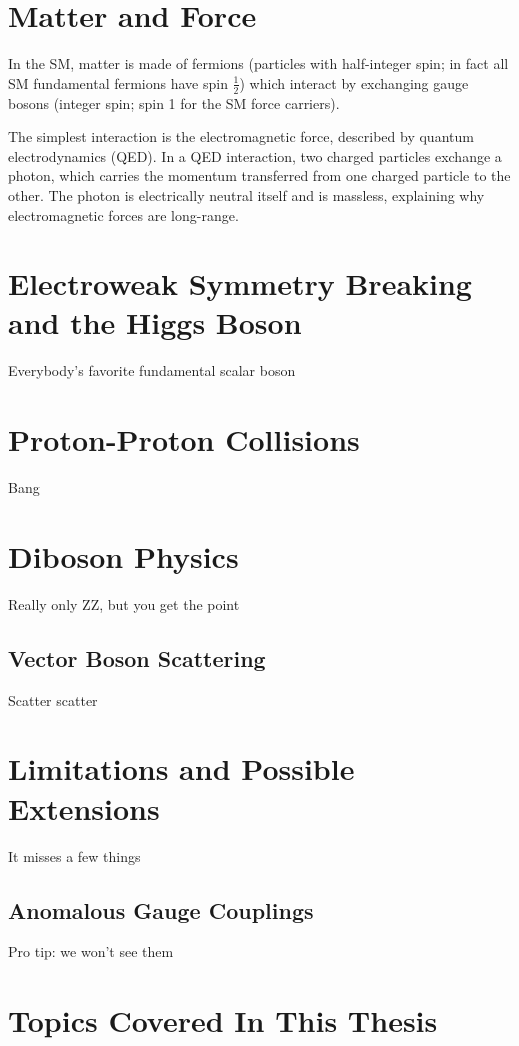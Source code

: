 \section{Matter and Force}

In the SM, matter is made of fermions (particles with half-integer spin; in fact all SM fundamental fermions have spin $\frac{1}{2}$) which interact by exchanging gauge bosons (integer spin; spin 1 for the SM force carriers).


The simplest interaction is the electromagnetic force, described by quantum electrodynamics (QED).
In a QED interaction, two charged particles exchange a photon, which carries the momentum transferred from one charged particle to the other.
The photon is electrically neutral itself and is massless, explaining why electromagnetic forces are long-range.




\section{Electroweak Symmetry Breaking and the Higgs Boson}
Everybody's favorite fundamental scalar boson



\section{Proton-Proton Collisions}\label{sec:pp}
Bang



\section{Diboson Physics}
Really only ZZ, but you get the point

\subsection{Vector Boson Scattering}
Scatter scatter


\section{Limitations and Possible Extensions}
It misses a few things

\subsection{Anomalous Gauge Couplings}
Pro tip: we won't see them



\section{Topics Covered In This Thesis}
